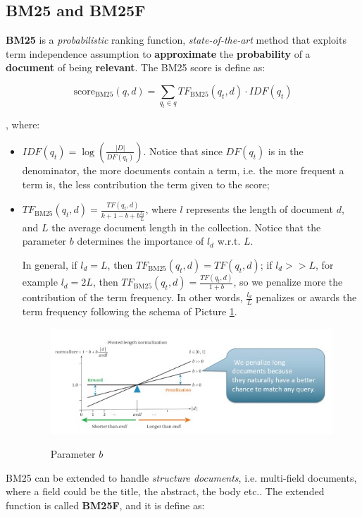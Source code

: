 \subsection{BM25 and BM25F}
\textbf{BM25} is a \textit{probabilistic} ranking function, \textit{state-of-the-art} method that exploits term independence assumption to \textbf{approximate} the \textbf{probability} of a \textbf{document} of being \textbf{relevant}. The BM25 score is define as:

$$
\text{score}_{\text{BM25}}(q,d) = \sum_{q_t \in q} TF_{\text{BM25}}(q_t,d) \cdot IDF(q_t)
$$

, where:

\begin{itemize}
    \item $IDF(q_t) = \log (\frac{|D|}{DF(q_t)})$. Notice that since $DF(q_t)$ is in the denominator, the more documents contain a term, i.e. the more frequent a term is, the less contribution the term given to the score;
    \item $TF_{\text{BM25}}(q_t,d) = \frac{TF(q_t,d)}{k + 1 - b + b \frac{l_d}{L}}$, where $l$ represents the length of document $d$, and $L$ the average document length in the collection. Notice that the parameter $b$ determines the importance of $l_d$ w.r.t. $L$. 
    
    In general, if $l_d = L$, then $TF_{\text{BM25}}(q_t,d) = TF(q_t, d)$; if $l_d >> L$, for example $l_d = 2L$, then $TF_{\text{BM25}}(q_t,d) = \frac{TF(q_t,d)}{1+b}$, so we penalize more the contribution of the term frequency. In other words, $\frac{l_d}{L}$ penalizes or awards the term frequency following the schema of Picture \ref{bm25 1}.

    \begin{figure}[h!]
		\centering
        \includegraphics[scale = 1.8]{img/bm251.jpg}
		\label{bm25 1}
        \caption{Parameter $b$}
    \end{figure}
\end{itemize}

BM25 can be extended to handle \textit{structure documents}, i.e. multi-field documents, where a field could be the title, the abstract, the body etc.. The extended function is called \textbf{BM25F}, and it is define as:

